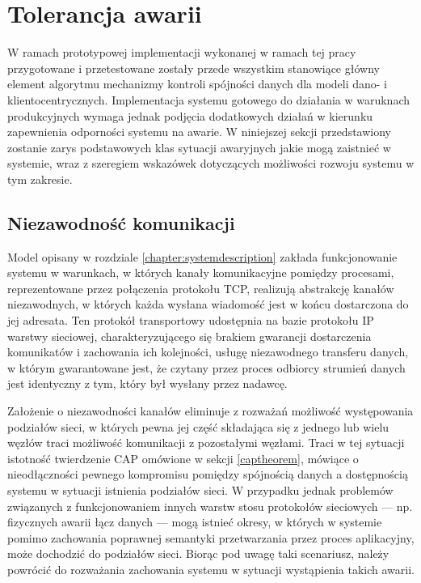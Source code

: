 \section{Tolerancja awarii} \label{section:faulttolerance}

W ramach prototypowej implementacji wykonanej w ramach tej pracy przygotowane i przetestowane zostały przede wszystkim stanowiące główny element algorytmu mechanizmy kontroli spójności danych dla modeli dano- i klientocentrycznych. Implementacja systemu gotowego do działania w waruknach produkcyjnych wymaga jednak podjęcia dodatkowych działań w kierunku zapewnienia odporności systemu na awarie. W niniejszej sekcji przedstawiony zostanie zarys podstawowych klas sytuacji awaryjnych jakie mogą zaistnieć w systemie, wraz z szeregiem wskazówek dotyczących możliwości rozwoju systemu w tym zakresie. 

\subsection*{Niezawodność komunikacji}

Model opisany w rozdziale \ref{chapter:systemdescription} zakłada funkcjonowanie systemu w warunkach, w których kanały komunikacyjne pomiędzy procesami, reprezentowane przez połączenia protokołu TCP, realizują abstrakcję kanałów niezawodnych, w których każda wysłana wiadomość jest w końcu dostarczona do jej adresata. Ten protokół transportowy udostępnia na bazie protokołu IP warstwy sieciowej, charakteryzującego się brakiem gwarancji dostarczenia komunikatów i zachowania ich kolejności, usługę niezawodnego transferu danych, w którym gwarantowane jest, że czytany przez proces odbiorcy strumień danych jest identyczny z tym, który był wysłany przez nadawcę.


Założenie o niezawodności kanałów eliminuje z rozważań możliwość występowania podziałów sieci, w których pewna jej część składająca się z jednego lub wielu węzłów traci możliwość komunikacji z pozostałymi węzłami. Traci w tej sytuacji istotność twierdzenie CAP omówione w sekcji \ref{captheorem}, mówiące o nieodłączności pewnego kompromisu pomiędzy spójnością danych a dostępnością systemu w sytuacji istnienia podziałów sieci. W przypadku jednak problemów związanych z funkcjonowaniem innych warstw stosu protokołów sieciowych --- np. fizycznych awarii łącz danych --- mogą istnieć okresy, w których w systemie pomimo zachowania poprawnej semantyki przetwarzania przez proces aplikacyjny, może dochodzić do podziałów sieci. Biorąc pod uwagę taki scenariusz, należy powrócić do rozważania zachowania systemu w sytuacji wystąpienia takich awarii.

